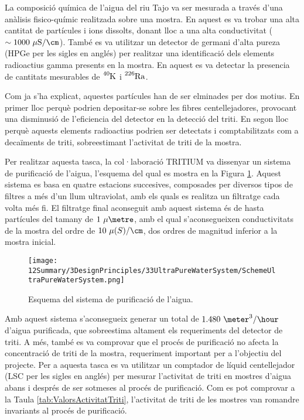 La composició química de l'aigua del riu Tajo va ser mesurada a través d'una anàlisis fisico-químic realitzada sobre una mostra. En aquest es va trobar una alta cantitat de partícules i ions dissolts, donant lloc a una alta conductivitat ($\sim 1000~\mu\text{S}/\cm$). També es va utilitzar un detector de germani d'alta pureza (HPGe per les sigles en anglés) per realitzar una identificació dels elements radioactius gamma presents en la mostra. En aquest es va detectar la presencia de cantitats mesurables de $\ce{^{40}K}$ i $\ce{^{226}Ra}$.

Com ja s'ha explicat, aquestes partícules han de ser elminades per dos motius. En primer lloc perquè podrien depositar-se sobre les fibres centellejadores, provocant una disminusió de l'eficiencia del detector en la detecció del triti. En segon lloc perquè aquests elements radioactius podrien ser detectats i comptabilitzats com a decaïments de triti, sobreestimant l'activitat de triti de la mostra.

Per realitzar aquesta tasca, la col·laboració TRITIUM va dissenyar un sistema de purificació de l'aigua, l'esquema del qual es mostra en la Figura \ref{fig:EsquemaSistemaAiguaUltrapura}. Aquest sistema es basa en quatre estacions succesives, composades per diversos tipos de filtres a més d'un llum ultraviolat, amb els quals es realitza un filtratge cada volta més fi. El filtratge final aconseguit amb aquest sistema és de hasta partícules del tamany de $1~\mu\metre$, amb el qual s'aconsegueixen conductivitats de la mostra del ordre de $10~\mu\text(S)/\cm$, dos ordres de magnitud inferior a la mostra inicial.

\begin{figure}[htbp]
\centering
\texttt{[image: 12Summary/3DesignPrinciples/33UltraPureWaterSystem/SchemeUltraPureWaterSystem.png]}
\caption{Esquema del sistema de purificació de l'aigua.\label{fig:EsquemaSistemaAiguaUltrapura}}
\end{figure}

Amb aquest sistema s'aconsegueix generar un total de $1.480~\meter^3/\hour$ d'aigua purificada, que sobreestima altament els requeriments del detector de triti. A més, també es va comprovar que el procés de purificació no afecta la concentració de triti de la mostra, requeriment important per a l'objectiu del projecte. Per a aquesta tasca es va utilitzar un comptador de líquid centellejador (LSC per les sigles en anglés) per mesurar l'activitat de triti en mostres d'aigua abans i després de ser sotmeses al procés de purificació. Com es pot comprovar a la Taula \ref{tab:ValorsActivitatTriti}, l'activitat de triti de les mostres van romandre invariants al procés de purificació.

